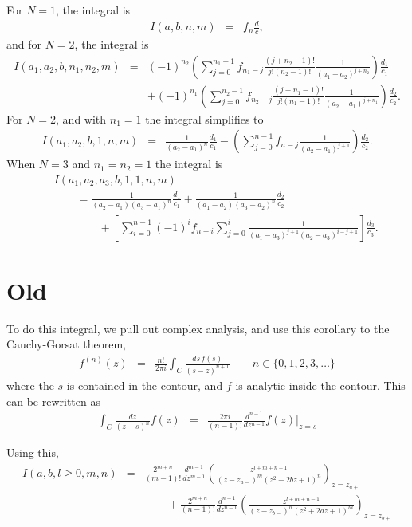 \documentclass[aps,prc,preprint,tightenlines]{revtex4}
\begin{document}
For $N=1$, the integral is
\begin{eqnarray}
I(a,b,n,m) &=& f_n \frac{d}{c},
\end{eqnarray}
and for $N=2$, the integral is
\begin{eqnarray}
I(a_1,a_2,b,n_1,n_2,m)
&=&
(-1)^{n_2}
\left( \sum_{j=0}^{n_1-1} f_{n_1-j} \frac{(j+n_2-1)!}{j!(n_2-1)!}
\frac{1}{(a_1-a_2)^{j+n_2}} \right)
\frac{d_1}{c_1} \nonumber\\&&
+
(-1)^{n_1}
\left( \sum_{j=0}^{n_2-1} f_{n_2-j} \frac{(j+n_1-1)!}{j!(n_1-1)!}
\frac{1}{(a_2-a_1)^{j+n_1}} \right)
\frac{d_2}{c_2}.
\end{eqnarray}
For $N=2$, and with $n_1=1$ the integral simplifies to
\begin{eqnarray}
I(a_1,a_2,b,1,n,m)
&=& \frac{1}{(a_2-a_1)^n} \frac{d_1}{c_1}
- \left( \sum_{j=0}^{n-1} f_{n-j} \frac{1}{(a_2-a_1)^{j+1}} \right)
\frac{d_2}{c_2}.
\end{eqnarray}
When $N=3$ and $n_1=n_2=1$ the integral is
\begin{eqnarray}
&&I(a_1,a_2,a_3,b,1,1,n,m) \nonumber\\
&&\qquad=
\frac{1}{(a_2-a_1)(a_3-a_1)^n} \frac{d_1}{c_1} +
\frac{1}{(a_1-a_2)(a_3-a_2)^n} \frac{d_2}{c_2} \nonumber\\&& \qquad\qquad+
\left[ \sum_{i=0}^{n-1} (-1)^i f_{n-i}
\sum_{j=0}^i \frac{1}{(a_1-a_3)^{j+1}(a_2-a_3)^{i-j+1}} \right] \frac{d_3}{c_3}.
\end{eqnarray}

\section{Old}

To do this integral, we pull out complex analysis, and use this corollary
to the Cauchy-Gorsat theorem,
\begin{eqnarray}
f^{(n)}(z) &=& \frac{n!}{2\pi i} \int_C \frac{ds \, f(s)}{(s-z)^{n+1}}
 \qquad n \in \{0,1,2,3,\ldots\} \nonumber
\end{eqnarray}
where the $s$ is contained in the contour, and $f$ is analytic inside
the contour.  This can be rewritten as
\begin{eqnarray}
\int_C \frac{dz}{(z-s)^{n}} f(z)
&=& 
\frac{2\pi i}{(n-1)!} \frac{d^{n-1}}{dz^{n-1}} \left.f(z)\right|_{z=s} 
\nonumber 
\end{eqnarray}

Using this,
\begin{eqnarray}
I(a,b,l\geq 0,m,n) &=& 
\frac{2^{m+n}}{(m-1)!} \frac{d^{m-1}}{d z^{m-1}} \left(
\frac{z^{l+m+n-1}}{(z-z_{a-})^m (z^2 + 2 b z + 1)^n}
\right)_{z=z_{a+}} + \nonumber \\
& & \qquad +
\frac{2^{m+n}}{(n-1)!} \frac{d^{n-1}}{d z^{n-1}} \left(
\frac{z^{l+m+n-1}}{(z-z_{b-})^n (z^2 + 2 a z + 1)^m}
\right)_{z=z_{b+}} \nonumber
\end{eqnarray}
\end{document}
